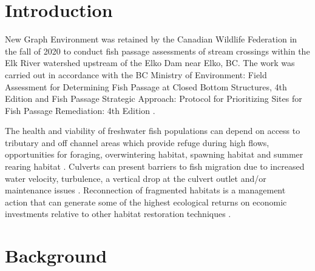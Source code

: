 \documentclass[
]{book}
\begin{document}
\hypertarget{intro}{%
\chapter{Introduction}\label{intro}}

New Graph Environment was retained by the Canadian Wildlife Federation in the fall of 2020 to conduct fish passage assessments of stream crossings within the Elk River watershed upstream of the Elko Dam near Elko, BC. The work was carried out in accordance with the BC Ministry of Environment: Field Assessment for Determining Fish Passage at Closed Bottom Structures, 4th Edition \citep{fish_passage_assessments} and Fish Passage Strategic Approach: Protocol for Prioritizing Sites for Fish Passage Remediation: 4th Edition \citep{fishpassagetechnicalworkinggroupFishPassageStrategic2014}.

The health and viability of freshwater fish populations can depend on access to tributary and off channel areas which provide refuge during high flows, opportunities for foraging, overwintering habitat, spawning habitat and summer rearing habitat \citep{Bramblett_2002, swalesRoleOffChannelPonds1989}. Culverts can present barriers to fish migration due to increased water velocity, turbulence, a vertical drop at the culvert outlet and/or maintenance issues \citep{slaneyFishHabitatRehabilitation1997}. Reconnection of fragmented habitats is a management action that can generate some of the highest ecological returns on economic investments relative to other habitat restoration techniques \citep{saldicaromileStreamHabitatRestoration2004}.

\hypertarget{background}{%
\chapter{Background}\label{background}}
\end{document}
